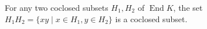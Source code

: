 For any two coclosed subsets $H_1, H_2$ of $\operatorname{End} K$, the set $H_1H_2 = \{xy \mid x \in H_1, y \in H_2\}$ is a coclosed subset.
